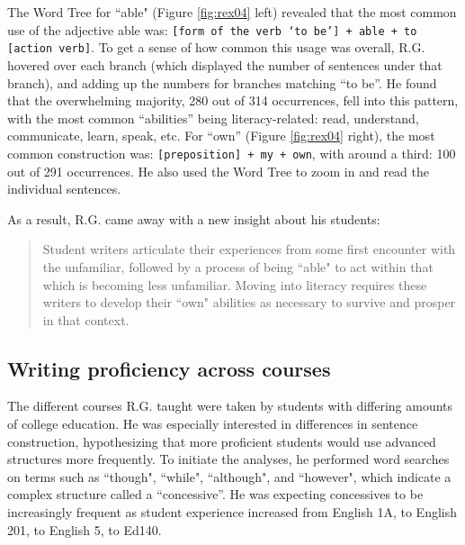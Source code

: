 \documentclass{sig-alternate}
\newcommand{\code}[1] {\texttt{#1}}
\begin{document}
The Word Tree for ``able" (Figure \ref{fig:rex04} left) revealed that the most common use of the adjective able was: \code{[form of the verb `to be'] + able + to [action verb]}. To get a sense of how common this usage was overall, R.G. hovered over each branch (which displayed the number of sentences under that branch), and adding up the numbers for branches matching ``to be''. He found that the overwhelming majority, 280 out of 314 occurrences, fell into this pattern, with the most common ``abilities'' being literacy-related: read, understand, communicate, learn, speak, etc. For  ``own'' (Figure \ref{fig:rex04} right), the most common construction was: \code{[preposition] + my + own}, with around a third: 100 out of 291 occurrences.  He also used the Word Tree to zoom in and read the individual sentences.

As a result, R.G. came away with a new insight about his students:
\begin{quote}
Student writers articulate their experiences from some first encounter with the unfamiliar, followed by a process of being ``able" to act within that which is becoming less unfamiliar.  Moving into literacy requires these writers to develop their ``own" abilities as necessary to survive and prosper in that context.
\end{quote} 

\subsection{Writing proficiency across courses}
The different courses R.G. taught were taken by students with differing amounts of college education. He was especially interested in differences in sentence construction, hypothesizing that more proficient students would use advanced structures more frequently. To initiate the analyses, he performed word searches on terms such as ``though", ``while", ``although", and ``however", which indicate a complex structure called a ``concessive''. He was expecting concessives to be increasingly frequent as student experience increased from English 1A, to English 201, to English 5, to Ed140.
\end{document}
